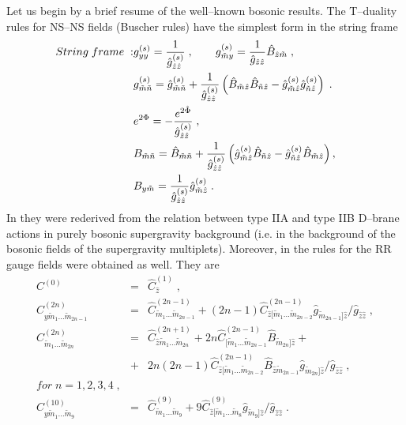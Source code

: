 \documentclass[a4paper,11pt]{article}
\begin{document}
Let us begin by a brief resume of the well--known bosonic results. The 
T--duality rules for NS--NS fields (Buscher rules) \cite{buscher} 
have the simplest form in the string frame
\begin{eqnarray}\label{TrAS}
String\; frame \; :  
& g^{(s)}_{yy}={1\over \hat{g}^{(s)}_{\hat{z}\hat{z}}}\; ,
\qquad
{g}^{(s)}_{\tilde{ {m}}y}= 
{1\over \hat{g}_{\hat{z}\hat{z}}}
\hat{B}_{\hat{z}\tilde{ {m}}}\; ,
\qquad \\ \label{TrulesA-S}
& g^{(s)}_{\tilde{ {m}}\tilde{ {n}}} =
\hat{g}^{(s)}_{\tilde{ {m}}\tilde{ {n}}}
+ {1\over \hat{g}^{(s)}_{\hat{z}\hat{z}}}
\left ( {\hat{B}}_{\tilde{ {m}} \hat{z}}
{\hat{B}}_{\tilde{ {n}} \hat{z}}
- \hat{g}^{(s)}_{\tilde{ {m}} \hat{z}}
\hat{g}^{(s)}_{\tilde{ {n}} \hat{z}}\right)\; . \qquad
\\ 
\label{TdilatBS}
& e^{2\Phi} =- {e^{2\hat{\Phi}}\over \hat{g}^{(s)}_{\hat{z}\hat{z}}}\; , \qquad
\\ 
\label{T-BbS}
& B_{\tilde{{ {m}}}\tilde{{ {n}}}} =
\hat{B}_{\tilde{{ {m}}}\tilde{{ {n}}}}
+ {1\over \hat{g}^{(s)}_{\hat{z}\hat{z}}}
\left ( \hat{g}^{(s)}_{\tilde{{ {m}}}\hat{z}}
\hat{B}_{\tilde{ {n}} \hat{z}} -
\hat{g}^{(s)}_{\tilde{ {n}} \hat{z}}
\hat{B}_{\tilde{ {m}} \hat{z}}
\right), \nonumber \\
& B_{y\tilde{ {m}}} =
 {1\over \hat{g}^{(s)}_{\hat{z}\hat{z}}} 
\hat{g}^{(s)}_{\tilde{ {m}} \hat{z}}\; .
\end{eqnarray}
In \cite{simon} they were rederived from the 
relation between 
type IIA and type IIB D--brane actions in purely bosonic supergravity 
background (i.e. in the background of the  bosonic fields 
of the supergravity multiplets). 
Moreover, in \cite{simon} the rules for the RR gauge fields 
were obtained as well. They are 
\begin{eqnarray}\label{0C0=}
C^{(0)}&=& \hat{C}^{(1)}_{\hat{z}} \; ,
\\ \label{0C2ny=}
C^{(2n)}_{y\tilde{m}_1\ldots \tilde{m}_{2n-1}} &=&
\hat{C}^{(2n-1)}_{\tilde{m}_1\ldots \tilde{m}_{2n-1}} +
(2n-1)
\hat{C}^{(2n-1)}_{\hat{z}[\tilde{m}_1\ldots \tilde{m}_{2n-2}}
\hat{g}_{\tilde{m}_{2n-1}]\hat{z}}/ {\hat{g}_{\hat{z}\hat{z}}} \; ,
\\ \label{0C2n-=}
C^{(2n)}_{\tilde{m}_1\ldots \tilde{m}_{2n}}&=&
\hat{C}^{(2n+1)}_{\hat{z}\tilde{m}_1\ldots \tilde{m}_{2n}} +
2n \hat{C}^{(2n-1)}_{[\tilde{m}_1\ldots \tilde{m}_{2n-1}}
\hat{B}_{\tilde{m}_{2n}]\hat{z}} + \nonumber \\
 &+& 2n(2n-1) \hat{C}^{(2n-1)}_{\hat{z}[\tilde{m}_1\ldots
\tilde{m}_{2n-2}}
\hat{B}_{\hat{z}\tilde{m}_{2n-1}}\hat{g}_{\tilde{m}_{2n}]\hat{z}}
/{\hat{g}_{\hat{z}\hat{z}}} \; , \\ 
\nonumber for \; n=1,2,3,4 \; , 
\\ \label{0C10=} 
C^{(10)}_{y\tilde{m}_1\ldots \tilde{m}_{9}} &=&
\hat{C}^{(9)}_{\tilde{m}_1\ldots \tilde{m}_{9}} +
9 
\hat{C}^{(9)}_{\hat{z}[\tilde{m}_1\ldots \tilde{m}_{8}}
\hat{g}_{\tilde{m}_{9}]\hat{z}}/ {\hat{g}_{\hat{z}\hat{z}}} \; .
\end{eqnarray}
\end{document}

